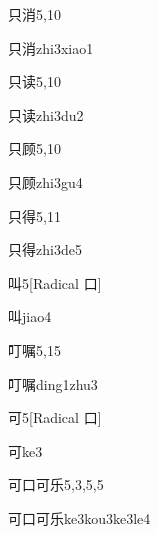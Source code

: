 \begin{entry}{只消}{5,10}
  \begin{phonetics}{只消}{zhi3xiao1}
  \end{phonetics}
\end{entry}

\begin{entry}{只读}{5,10}
  \begin{phonetics}{只读}{zhi3du2}
  \end{phonetics}
\end{entry}

\begin{entry}{只顾}{5,10}
  \begin{phonetics}{只顾}{zhi3gu4}
  \end{phonetics}
\end{entry}

\begin{entry}{只得}{5,11}
  \begin{phonetics}{只得}{zhi3de5}
  \end{phonetics}
\end{entry}

\begin{entry}{叫}{5}[Radical 口]
  \begin{phonetics}{叫}{jiao4}
  \end{phonetics}
\end{entry}

\begin{entry}{叮嘱}{5,15}
  \begin{phonetics}{叮嘱}{ding1zhu3}
  \end{phonetics}
\end{entry}

\begin{entry}{可}{5}[Radical 口]
  \begin{phonetics}{可}{ke3}
  \end{phonetics}
\end{entry}

\begin{entry}{可口可乐}{5,3,5,5}
  \begin{phonetics}{可口可乐}{ke3kou3ke3le4}
  \end{phonetics}
\end{entry}

